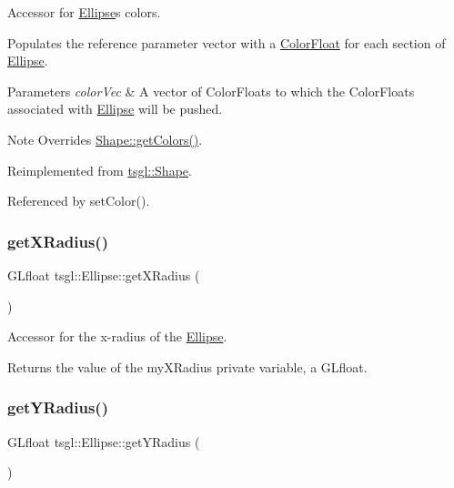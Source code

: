 Accessor for \hyperlink{classtsgl_1_1_ellipse}{Ellipse}\textquotesingle{}s colors. 

Populates the reference parameter vector with a \hyperlink{structtsgl_1_1_color_float}{Color\+Float} for each section of \hyperlink{classtsgl_1_1_ellipse}{Ellipse}. 
\begin{DoxyParams}{Parameters}
{\em color\+Vec} & A vector of Color\+Floats to which the Color\+Floats associated with \hyperlink{classtsgl_1_1_ellipse}{Ellipse} will be pushed. \\
\hline
\end{DoxyParams}
\begin{DoxyNote}{Note}
Overrides \hyperlink{classtsgl_1_1_shape_a6f54fe4d049f69a287edf8335a9509f8}{Shape\+::get\+Colors()}. 
\end{DoxyNote}


Reimplemented from \hyperlink{classtsgl_1_1_shape_a6f54fe4d049f69a287edf8335a9509f8}{tsgl\+::\+Shape}.



Referenced by set\+Color().

\mbox{\label{classtsgl_1_1_ellipse_ad3e100cf6e0cb429a3be1e5162c4aa61}} 
\subsubsection{\texorpdfstring{get\+X\+Radius()}{getXRadius()}}
{\footnotesize\ttfamily G\+Lfloat tsgl\+::\+Ellipse\+::get\+X\+Radius (\begin{DoxyParamCaption}{ }\end{DoxyParamCaption})\hspace{0.3cm}{\ttfamily [inline]}}



Accessor for the x-\/radius of the \hyperlink{classtsgl_1_1_ellipse}{Ellipse}. 

Returns the value of the my\+X\+Radius private variable, a G\+Lfloat. \mbox{\label{classtsgl_1_1_ellipse_ab4371a2fae21b7fb874a4f5232e92f40}} 
\subsubsection{\texorpdfstring{get\+Y\+Radius()}{getYRadius()}}
{\footnotesize\ttfamily G\+Lfloat tsgl\+::\+Ellipse\+::get\+Y\+Radius (\begin{DoxyParamCaption}{ }\end{DoxyParamCaption})\hspace{0.3cm}{\ttfamily [inline]}}



